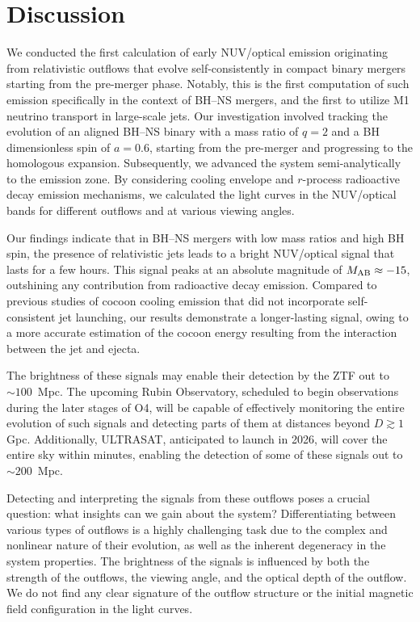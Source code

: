 \documentclass[twocolumn,dvipsnames]{aastex62}
\begin{document}
\section{Discussion}\label{sec:discussion}

We conducted the first calculation of early NUV/optical emission originating from relativistic outflows that evolve self-consistently in compact binary mergers starting from the pre-merger phase. Notably, this is the first computation of such emission specifically in the context of BH--NS mergers, and the first to utilize M1 neutrino transport in large-scale jets. Our investigation involved tracking the evolution of an aligned BH--NS binary with a mass ratio of $ q = 2 $ and a BH dimensionless spin of $ a = 0.6 $, starting from the pre-merger and progressing to the homologous expansion. Subsequently, we advanced the system semi-analytically to the emission zone. By considering cooling envelope and $r$-process radioactive decay emission mechanisms, we calculated the light curves in the NUV/optical bands for different outflows and at various viewing angles.

Our findings indicate that in BH--NS mergers with low mass ratios and high BH spin, the presence of relativistic jets leads to a bright NUV/optical signal that lasts for a few hours. This signal peaks at an absolute magnitude of $M_{\rm AB} \approx -15 $, outshining any contribution from radioactive decay emission. Compared to previous studies of cocoon cooling emission that did not incorporate self-consistent jet launching, our results demonstrate a longer-lasting signal, owing to a more accurate estimation of the cocoon energy resulting from the interaction between the jet and ejecta.

The brightness of these signals may enable their detection by the ZTF out to $ \sim 100 $~Mpc. The upcoming Rubin Observatory, scheduled to begin observations during the later stages of O4, will be capable of effectively monitoring the entire evolution of such signals and detecting parts of them at distances beyond $D \gtrsim 1$ Gpc. Additionally, ULTRASAT, anticipated to launch in 2026, will cover the entire sky within minutes, enabling the detection of some of these signals out to $ \sim 200$~Mpc.

Detecting and interpreting the signals from these outflows poses a crucial question: what insights can we gain about the system? Differentiating between various types of outflows is a highly challenging task due to the complex and nonlinear nature of their evolution, as well as the inherent degeneracy in the system properties. The brightness of the signals is influenced by both the strength of the outflows, the viewing angle, and the optical depth of the outflow. We do not find any clear signature of the outflow structure or the initial magnetic field configuration in the light curves.
\end{document}
